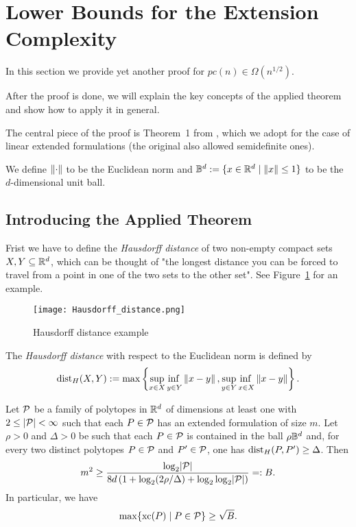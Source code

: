 \section{Lower Bounds for the Extension Complexity}

In this section we provide yet another proof for $pc(n) \in \Omega(n^{1/2})$.

After the proof is done, we will explain the key concepts of the applied theorem and show how to apply it in general.

The central piece of the proof is Theorem~1 from \cite{averkov2016maximum}, which we adopt for the case of linear extended formulations (the original also allowed semidefinite ones).

We define $\norm{\cdot}$ to be the Euclidean norm and $\B^d := \{ x \in \R^d \mid \norm{x} \leq 1 \}$ to be the $d$-dimensional unit ball.



\subsection{Introducing the Applied Theorem}

Frist we have to define the \emph{Hausdorff distance} of two non-empty compact sets $X,Y \subseteq \R^d$, which can be thought of "the longest distance you can be forced to travel from a point in one of the two sets to the other set". See Figure~\ref{fig:hausdorff} for an example.

\begin{figure}[h]
  \centering
  \texttt{[image: Hausdorff\_distance.png]}
  \caption{Hausdorff distance example \cite{rocchini2007hausdorff}}
  \label{fig:hausdorff}
\end{figure}

\begin{definition}
  The \emph{Hausdorff distance} with respect to the Euclidean norm is defined by $$ \dist_H(X,Y) := \max \left\{ \adjustlimits \sup_{x \in X} \inf_{y \in Y} \norm{x-y}, \adjustlimits \sup_{y \in Y} \inf_{x \in X} \norm{x-y} \right\} .$$
\end{definition}

\begin{theorem}\label{theorem:family}
  Let $\P$ be a family of polytopes in $\R^d$ of dimensions at least one with $2 \leq \abs{\P} < \infty $ such that each $P \in \P$ has an extended formulation of size $m$.
  Let $\rho > 0$ and $\Delta > 0$ be such that each $P \in \P$ is contained in the ball $\rho \B^d$ and, 
  for every two distinct polytopes $P \in \P$ and $P' \in \P$, one has $\dist_H(P, P') \geq \Delta$. 
  Then $$m^2 \geq \frac{\log_2 \abs{\P}}{8d \left(1 + \log_2 (2\rho/\Delta) + \log_2\log_2 \abs{\P} \right)} =: B.$$
  In particular, we have $$\max \{\xc(P) \mid P \in \P\}  \geq \sqrt{B} .$$
\end{theorem}



